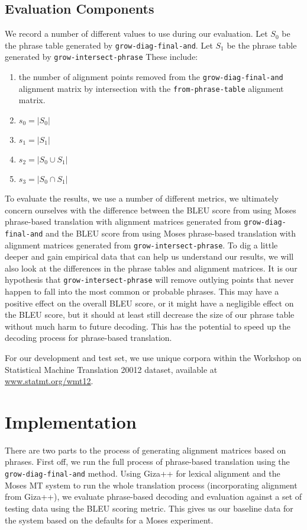 \documentclass[twocolumn]{article}
\newcommand{\originalAlign}{\texttt{grow-diag-final-and}}
\newcommand{\phraseAlign}{\texttt{from-phrase-table}}
\newcommand{\phraseIntersectAlign}{\texttt{grow-intersect-phrase}}
\newcommand{\wrapSingleSpacing}[1]{
  \singlespacing
  #1
  \onehalfspacing
}
\begin{document}
\subsection{Evaluation Components}
We record a number of different values to use during our evaluation.
Let $S_0$ be the phrase table generated by \originalAlign{}.
Let $S_1$ be the phrase table generated by \phraseIntersectAlign{}
These include:
\wrapSingleSpacing{
\begin{enumerate}
  \item the number of alignment points removed from
    the \originalAlign{} alignment matrix
    by intersection with
    the \phraseAlign{} alignment matrix.
  \item $s_0 = |S_0|$
  \item $s_1 = |S_1|$
  \item $s_2 = |S_0 \cup S_1|$
  \item $s_3 = |S_0 \cap S_1|$
\end{enumerate}
}

To evaluate the results, we use a number of different metrics, we ultimately
concern ourselves with the difference between the BLEU score from using Moses
phrase-based translation with alignment matrices generated from \originalAlign{}
and the BLEU score from using Moses phrase-based translation with alignment
matrices generated from \phraseIntersectAlign{}.
To dig a little deeper and gain empirical data that can help us understand our
results, we will also look at the differences in the phrase tables and alignment
matrices. It is our hypothesis that \phraseIntersectAlign{} will remove outlying
points that never happen to fall into the most common or probable phrases. This
may have a positive effect on the overall BLEU score, or it might have a
negligible effect on the BLEU score, but it should at least still decrease the
size of our phrase table without much harm to future decoding. This has the
potential to speed up the decoding process for phrase-based translation.

For our development and test set, we use unique corpora within the Workshop on
Statistical Machine Translation 20012 dataset, available at
\href{http://www.statmt.org/wmt12/dev.tgz}
     {\underline{www.statmt.org/wmt12}}.


\section{Implementation}
There are two parts to the process of generating alignment matrices based on
phrases. First off, we run the full process of phrase-based translation using
the \originalAlign{} method. Using Giza++ for lexical alignment and the Moses MT
system to run the whole translation process (incorporating alignment from
Giza++), we evaluate phrase-based decoding and evaluation against a set of
testing data using the BLEU scoring metric. This gives us our baseline data for
the system based on the defaults for a Moses experiment.
\end{document}
